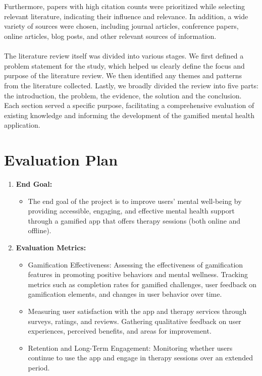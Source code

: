 \documentclass[manuscript,screen,review]{acmart}
\begin{document}
\\ \\
Furthermore, papers with high citation counts were prioritized while selecting relevant literature, indicating their influence and relevance. 
In addition, a wide variety of sources were chosen, including journal articles, conference papers, online articles, blog posts, and other relevant sources of information. 
\\ \\
The literature review itself was divided into various stages. We first defined a problem statement for the study, which helped us clearly define the focus and purpose of the literature review. We then identified any themes and patterns from the literature collected. Lastly, we broadly divided the review into five parts: the introduction, the problem, the evidence, the solution and the conclusion. Each section served a specific purpose, facilitating a comprehensive evaluation of existing knowledge and informing the development of the gamified mental health application.

\section{Evaluation Plan}
\begin{enumerate}
    \item \textbf{End Goal:}
    \begin{itemize}
        \item The end goal of the project is to improve users' mental well-being by providing accessible, engaging, and effective mental health support through a gamified app that offers therapy sessions (both online and offline).
        
    \end{itemize}
    \item \textbf{Evaluation Metrics:}
    \begin{itemize}
        \item Gamification Effectiveness: Assessing the effectiveness of gamification features in promoting positive behaviors and mental wellness. Tracking metrics such as completion rates for gamified challenges, user feedback on gamification elements, and changes in user behavior over time.
        \item Measuring user satisfaction with the app and therapy services through surveys, ratings, and reviews. Gathering qualitative feedback on user experiences, perceived benefits, and areas for improvement.
        \item Retention and Long-Term Engagement: Monitoring whether users continue to use the app and engage in therapy sessions over an extended period.

    \end{itemize}
\end{enumerate}
\end{document}
